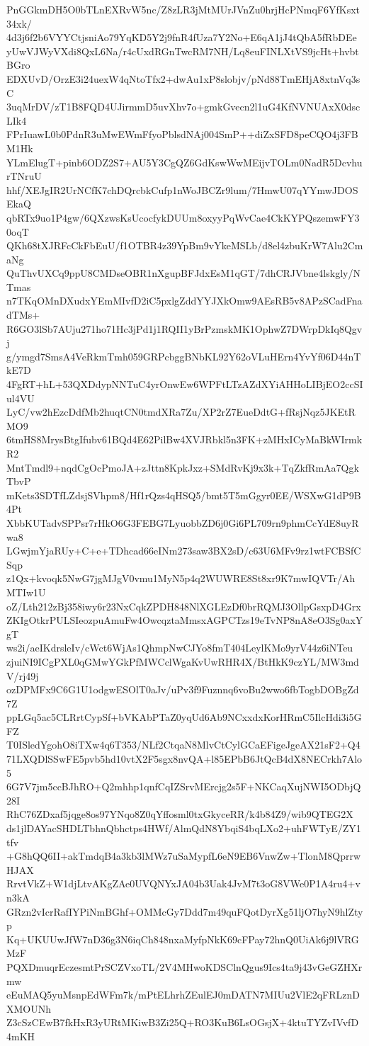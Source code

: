 PnGGkmDH5O0bTLnEXRvW5nc/Z8zLR3jMtMUrJVnZu0hrjHcPNmqF6YfKsxt34xk/
4d3j6f2b6VYYCtjsniAo79YqKD5Y2j9fnR4fUza7Y2No+E6qA1jJ4tQbA5fRbDEe
yUwVJWyVXdi8QxL6Na/r4cUxdRGnTwcRM7NH/Lq8euFINLXtVS9jcHt+hvbtBGro
EDXUvD/OrzE3i24uexW4qNtoTfx2+dwAu1xP8slobjv/pNd88TmEHjA8xtnVq3sC
3uqMrDV/zT1B8FQD4UJirmmD5uvXhv7o+gmkGvecn2l1uG4KfNVNUAxX0dscLIk4
FPrIuawL0b0PdnR3uMwEWmFfyoPblsdNAj004SmP++diZxSFD8peCQO4j3FBM1Hk
YLmElugT+pinb6ODZ2S7+AU5Y3CgQZ6GdKswWwMEijvTOLm0NadR5DcvhurTNruU
hhf/XEJgIR2UrNCfK7chDQrcbkCufp1nWoJBCZr9lum/7HmwU07qYYmwJDOSEkaQ
qbRTx9uo1P4gw/6QXzwsKsUcocfykDUUm8oxyyPqWvCae4CkKYPQszemwFY30oqT
QKh68tXJRFcCkFbEuU/f1OTBR4z39YpBm9vYkeMSLb/d8el4zbuKrW7Alu2CmaNg
QuThvUXCq9ppU8CMDseOBR1nXgupBFJdxEsM1qGT/7dhCRJVbne4lskgly/NTmas
n7TKqOMnDXudxYEmMIvfD2iC5pxlgZddYYJXkOmw9AEsRB5v8APzSCadFnadTMs+
R6GO3lSb7AUju271ho71Hc3jPd1j1RQII1yBrPzmskMK1OphwZ7DWrpDkIq8Qgvj
g/ymgd7SmsA4VeRkmTmh059GRPcbggBNbKL92Y62oVLuHErn4YvYf06D44nTkE7D
4FgRT+hL+53QXDdypNNTuC4yrOnwEw6WPFtLTzAZdXYiAHHoLIBjEO2ccSIul4VU
LyC/vw2hEzcDdfMb2huqtCN0tmdXRa7Zu/XP2rZ7EueDdtG+fRsjNqz5JKEtRMO9
6tmHS8MrysBtgIfubv61BQd4E62PilBw4XVJRbkl5n3FK+zMHxICyMaBkWIrmkR2
MntTmdl9+nqdCgOcPmoJA+zJttn8KpkJxz+SMdRvKj9x3k+TqZkfRmAa7QgkTbvP
mKets3SDTfLZdsjSVhpm8/Hf1rQzs4qHSQ5/bmt5T5mGgyr0EE/WSXwG1dP9B4Pt
XbbKUTadvSPPsr7rHkO6G3FEBG7LyuobbZD6j0Gi6PL709rn9phmCcYdE8uyRwa8
LGwjmYjaRUy+C+e+TDhcad66eINm273saw3BX2sD/c63U6MFv9rz1wtFCBSfCSqp
z1Qx+kvoqk5NwG7jgMJgV0vmu1MyN5p4q2WUWRE8St8xr9K7mwIQVTr/AhMTIw1U
oZ/Lth212zBj358iwy6r23NxCqkZPDH848NlXGLEzDf0brRQMJ3OllpGsxpD4Grx
ZKIgOtkrPULSIeozpuAmuFw4OwcqztaMmsxAGPCTzs19eTvNP8nA8eO3Sg0axYgT
ws2i/aeIKdrsleIv/cWct6WjAs1QhmpNwCJYo8fmT404LeylKMo9yrV44z6iNTeu
zjuiNI9ICgPXL0qGMwYGkPfMWCclWgaKvUwRHR4X/BtHkK9czYL/MW3mdV/rj49j
ozDPMFx9C6G1U1odgwESOlT0aJv/uPv3f9Fuznnq6voBu2wwo6fbTogbDOBgZd7Z
ppLGq5ac5CLRrtCypSf+bVKAbPTaZ0yqUd6Ab9NCxxdxKorHRmC5IlcHdi3i5GFZ
T0ISledYgohO8iTXw4q6T353/NLf2CtqaN8MlvCtCylGCaEFigeJgeAX21sF2+Q4
71LXQDlSSwFE5pvb5hd10vtX2F5sgx8nvQA+l85EPbB6JtQcB4dX8NECrkh7Alo5
6G7V7jm5ccBJhRO+Q2mhhp1qnfCqIZSrvMErcjg2s5F+NKCaqXujNWI5ODbjQ28I
RhC76ZDxaf5jqge8os97YNqo8Z0qYffosml0txGkyceRR/k4b84Z9/wib9QTEG2X
ds1jlDAYacSHDLTbhnQbhctps4HWf/AlmQdN8YbqiS4bqLXo2+uhFWTyE/ZY1tfv
+G8hQQ6II+akTmdqB4a3kb3lMWz7uSaMypfL6eN9EB6VnwZw+TlonM8QprrwHJAX
RrvtVkZ+W1djLtvAKgZAe0UVQNYxJA04b3Uak4JvM7t3oG8VWe0P1A4ru4+vn3kA
GRzn2vIcrRafIYPiNmBGhf+OMMcGy7Ddd7m49quFQotDyrXg51ljO7hyN9hlZtyp
Kq+UKUUwJfW7nD36g3N6iqCh848nxaMyfpNkK69cFPay72hnQ0UiAk6j9lVRGMzF
PQXDmuqrEczesmtPrSCZVxoTL/2V4MHwoKDSClnQgus9Ics4ta9j43vGeGZHXrmw
eEuMAQ5yuMsnpEdWFm7k/mPtELhrhZEulEJ0mDATN7MIUu2VlE2qFRLznDXMOUNh
Z3cSzCEwB7fkHxR3yURtMKiwB3Zi25Q+RO3KuB6LsOGsjX+4ktuTYZvIVvfD4mKH
